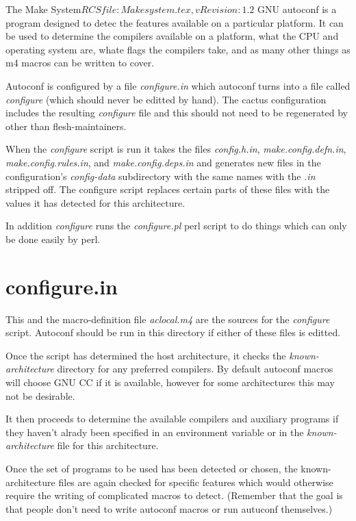 \begin{cactuspart}{3}{The Make System}{$RCSfile: Makesystem.tex,v $}{$Revision: 1.2 $}
GNU autoconf is a program designed to detec the features available
on a particular platform.  It can be used to determine the 
compilers available on a platform, what the CPU and operating 
system are, whate flags the compilers take, and as many other things
as m4 macros can be written to cover.

Autoconf is configured by a file {\em configure.in} which autoconf
turns into a file called {\em configure} (which should never be
editted by hand).  The cactus configuration includes the resulting
{\em configure} file and this should not need to be regenerated by
other than flesh-maintainers.

When the {\em configure} script is run it takes the files
{\em config.h.in}, {\em make.config.defn.in}, {\em make.config.rules.in},
and {\em make.config.deps.in} and generates new files in the 
configuration's {\em config-data} subdirectory with the same names with the
{\em .in} stripped off.  The configure script replaces certain parts of these
files with the values it has detected for this architecture.

In addition {\em configure} runs the {\em configure.pl} perl script to
do things which can only be done easily by perl.

\section{configure.in}
\label{sec:autoconf:configure}

This and the macro-definition file {\em aclocal.m4} are the 
sources for the {\em configure} script.  Autoconf should be
run in this directory if either of these files is editted.

Once the script has determined the host architecture, it checks
the {\em known-architecture} directory for any preferred 
compilers.  By default autoconf macros will choose GNU CC if
it is available, however for some architectures this may not be
desirable.

It then proceeds to determine the available compilers and auxiliary
programs if they haven't alrady been specified in an environment variable
or in the {\em known-architecture} file for this architecture.

Once the set of programs to be used has been detected or chosen, the
known-architecture files are again checked for specific features
which would otherwise require the writing of complicated macros to detect.
(Remember that the goal is that people don't need to write autoconf macros
or run autuconf themselves.)


\end{cactuspart}
